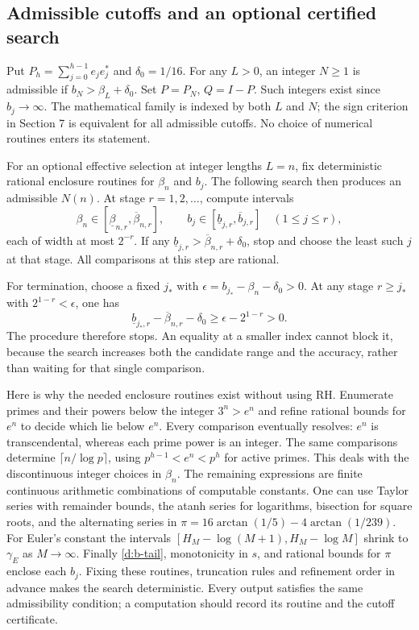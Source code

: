 \subsection{Admissible cutoffs and an optional certified search}
Put $P_h=\sum_{j=0}^{h-1}e_je_j^*$ and $\delta_0=1/16$.
For any $L>0$, an integer $N\ge1$ is admissible if
$b_N>\beta_L+\delta_0$. Set $P=P_N$, $Q=I-P$.
Such integers exist since $b_j\to\infty$. The mathematical family is
indexed by both $L$ and $N$; the sign criterion in Section 7 is equivalent
for all admissible cutoffs. No choice of numerical routines enters its
statement.

For an optional effective selection at integer lengths $L=n$, fix
deterministic rational enclosure routines for $\beta_n$ and $b_j$.
The following search then produces an admissible $N(n)$.
At stage $r=1,2,\ldots$, compute intervals
\[
\beta_n\in[\underline\beta_{n,r},\overline\beta_{n,r}],
\qquad b_j\in[\underline b_{j,r},\overline b_{j,r}]
\quad(1\le j\le r),
\]
each of width at most $2^{-r}$. If any
$\underline b_{j,r}>\overline\beta_{n,r}+\delta_0$, stop and choose the
least such $j$ at that stage. All comparisons at this step are rational.

For termination, choose a fixed $j_*$ with
$\epsilon=b_{j_*}-\beta_n-\delta_0>0$. At any stage $r\ge j_*$
with $2^{1-r}<\epsilon$, one has
\[
\underline b_{j_*,r}-\overline\beta_{n,r}-\delta_0
\ge\epsilon-2^{1-r}>0.
\]
The procedure therefore stops. An equality at a smaller index cannot
block it, because the search increases both the candidate range and the
accuracy, rather than waiting for that single comparison.

Here is why the needed enclosure routines exist without using RH.
Enumerate primes and their powers below the integer $3^n>e^n$ and refine
rational bounds for $e^n$ to decide which lie below $e^n$. Every comparison
eventually resolves: $e^n$ is transcendental, whereas each prime power is
an integer. The same comparisons determine
$\lceil n/\log p\rceil$, using $p^{h-1}<e^n<p^h$ for active primes.
This deals with the discontinuous integer choices in $\beta_n$.
The remaining expressions are finite continuous arithmetic combinations
of computable constants. One can use Taylor series with remainder bounds,
the atanh series for logarithms, bisection for square roots, and the
alternating series in
$\pi=16\arctan(1/5)-4\arctan(1/239)$.
For Euler's constant the intervals
$[H_M-\log(M+1),H_M-\log M]$ shrink to $\gamma_E$ as $M\to\infty$.
Finally \eqref{d:b-tail}, monotonicity in $s$, and rational bounds for
$\pi$ enclose each $b_j$. Fixing these routines, truncation rules and
refinement order in advance makes the search deterministic.
Every output satisfies the same admissibility condition; a computation
should record its routine and the cutoff certificate.

